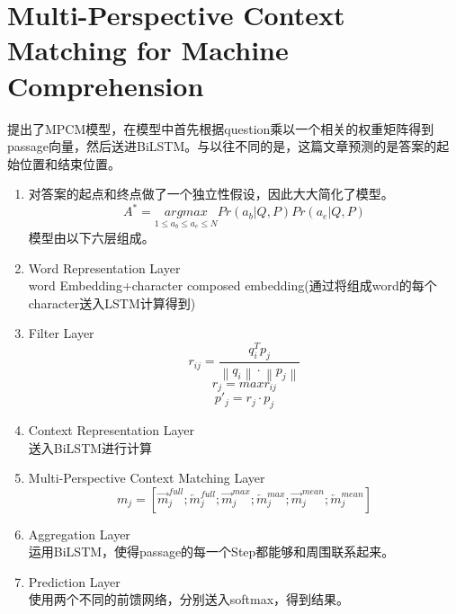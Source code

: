 \documentclass[a4paper,UTF8]{article}
\numberwithin{equation}{section}
\begin{document}
\section{Multi-Perspective Context Matching for Machine Comprehension}
提出了MPCM模型，在模型中首先根据question乘以一个相关的权重矩阵得到passage向量，然后送进BiLSTM。与以往不同的是，这篇文章预测的是答案的起始位置和结束位置。
\begin{enumerate}
    \item 对答案的起点和终点做了一个独立性假设，因此大大简化了模型。$$A^*=\underset{1 \leq a_b \leq a_e \leq N}{argmax}Pr(a_b|Q,P)Pr(a_e|Q,P)$$模型由以下六层组成。
    \item Word Representation Layer\\word Embedding+character composed embedding(通过将组成word的每个character送入LSTM计算得到)
    \item Filter Layer\\$$r_{ij}=\frac{q_i^Tp_j}{\left \| q_i \right \|\cdot \left \| p_j \right \|}$$
    $$r_j = max r_{ij}$$  $$p'_j = r_j \cdot p_j$$
    \item Context Representation Layer\\送入BiLSTM进行计算
    \item Multi-Perspective Context Matching Layer\\$$m_j = [\overrightarrow{m}_j^{full};\overleftarrow{m}_j^{full};\overrightarrow{m}_j^{max};\overleftarrow{m}_j^{max};\overrightarrow{m}_j^{mean};\overleftarrow{m}_j^{mean}]$$
    \begin{figure}[H]
        \centering
        \quad
        \quad
    \end{figure}
    \item Aggregation Layer\\运用BiLSTM，使得passage的每一个Step都能够和周围联系起来。
    \item Prediction Layer\\使用两个不同的前馈网络，分别送入softmax，得到结果。
\end{enumerate}
\end{document}
